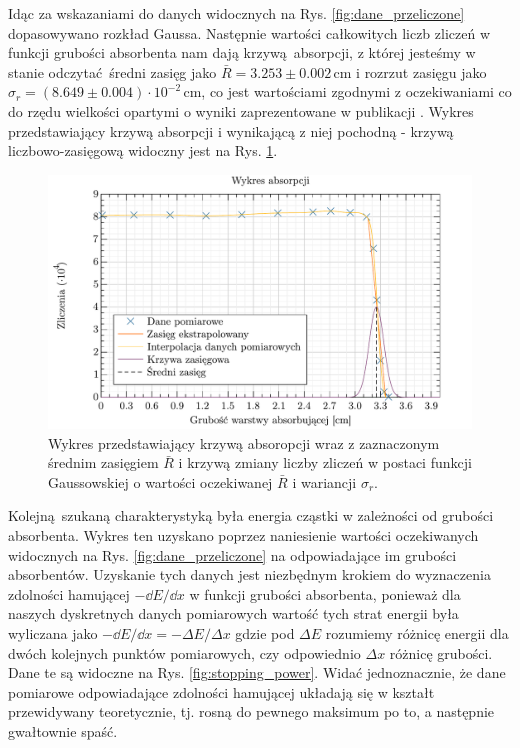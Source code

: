 \documentclass[12pt,a4paper]{article}
\begin{document}
Idąc za wskazaniami \cite{publikacja} do danych widocznych na  Rys. \ref{fig:dane_przeliczone} dopasowywano rozkład Gaussa. Następnie wartości całkowitych liczb zliczeń w funkcji grubości absorbenta nam dają krzywą absorpcji, z której jesteśmy w stanie odczytać średni zasięg jako $\bar{R} = 3.253 \pm 0.002$\,cm i rozrzut zasięgu jako $\sigma_r = (8.649 \pm 0.004)\cdot 10^{-2}$\,cm, co jest wartościami zgodnymi z oczekiwaniami co do rzędu wielkości opartymi o wyniki zaprezentowane w publikacji \cite{publikacja}. Wykres przedstawiający krzywą absorpcji i wynikającą z niej pochodną - krzywą liczbowo-zasięgową widoczny jest na Rys. \ref{fig:absorpcja}.

\begin{figure}[h!]
    \centering
    \includegraphics[keepaspectratio, width=0.8\linewidth]{absorpcja.pdf}
    \caption{Wykres przedstawiający krzywą absoropcji wraz z zaznaczonym średnim zasięgiem $\bar{R}$ i krzywą zmiany liczby zliczeń w postaci funkcji Gaussowskiej o wartości oczekiwanej $\bar{R}$ i wariancji $\sigma_r$.}
    \label{fig:absorpcja}
\end{figure}

\newpage

Kolejną szukaną charakterystyką była energia cząstki w zależności od grubości absorbenta. Wykres ten uzyskano poprzez naniesienie wartości oczekiwanych widocznych na Rys. \ref{fig:dane_przeliczone} na odpowiadające im grubości absorbentów. Uzyskanie tych danych jest niezbędnym krokiem do wyznaczenia zdolności hamującej $-\dd{E}/\dd{x}$ w funkcji grubości absorbenta, ponieważ dla naszych dyskretnych danych pomiarowych wartość tych strat energii była wyliczana jako $-\dd{E}/\dd{x} = - \Delta E / \Delta x$ gdzie pod $\Delta E$ rozumiemy różnicę energii dla dwóch kolejnych punktów pomiarowych, czy odpowiednio $\Delta x$ różnicę grubości. Dane te są widoczne na Rys. \ref{fig:stopping_power}. Widać jednoznacznie, że dane pomiarowe odpowiadające zdolności hamującej układają się w kształt przewidywany teoretycznie, tj. rosną do pewnego maksimum po to, a następnie gwałtownie spaść.
\end{document}
